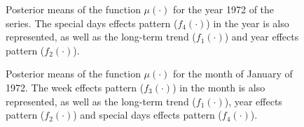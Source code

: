 \documentclass[onecolumn,a4paper,11pt]{article}
\begin{document}
\begin{figure}
\centering
{}
\caption{Posterior means of the function $\mu(\cdot)$ for the year 1972 of the series. The special days effects pattern ($f_4(\cdot)$) in the year is also represented, as well as the long-term trend ($f_1(\cdot)$) and year effects pattern ($f_2(\cdot)$). }
  \label{ch5_fig27_posteriors_oneyear_birthday}
\end{figure}

\begin{figure}
\centering
{}
\caption{Posterior means of the function $\mu(\cdot)$ for the month of January of 1972. The week effects pattern ($f_3(\cdot)$) in the month is also represented, as well as the long-term trend ($f_1(\cdot)$), year effects pattern ($f_2(\cdot)$) and special days effects pattern ($f_4(\cdot)$). }
  \label{ch5_fig27_posteriors_onemonth_birthday}
\end{figure}

 
\end{document}
